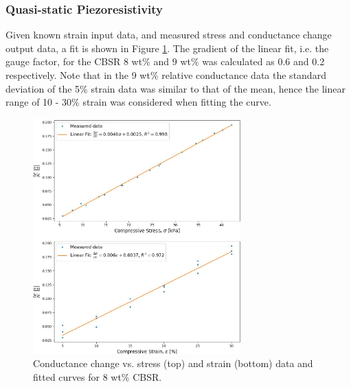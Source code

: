 \subsubsection{Quasi-static Piezoresistivity}\label{sec:Quasi-static Piezoresistivity2}
Given known strain input data, and measured stress and conductance change output data, a fit is shown in Figure \ref{fig:quasi_r_8p}. The gradient of the linear fit, i.e. the gauge factor, for the CBSR 8 wt\% and 9 wt\% was calculated as 0.6 and 0.2 respectively. Note that in the 9 wt\% relative conductance data the standard deviation of the 5\% strain data was similar to that of the mean, hence the linear range of 10 - 30\% strain was considered when fitting the curve.
\begin{figure}[h!]
    \centering
    \includegraphics[width=8cm]{Figures/CBSR_8p_cond_stress_strain_sin_titulo.jpg}
    \caption{Conductance change vs. stress (top) and strain (bottom) data and fitted curves for 8 wt\% CBSR.}
    \label{fig:quasi_r_8p}
\end{figure}


